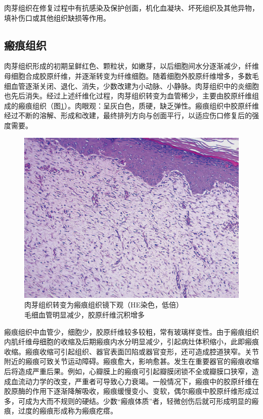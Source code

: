 肉芽组织在修复过程中有抗感染及保护创面，机化血凝块、坏死组织及其他异物，填补伤口或其他组织缺损等作用。

\subsection{瘢痕组织}

肉芽组织形成的初期呈鲜红色、颗粒状，如嫩芽，以后细胞间水分逐渐减少，纤维母细胞合成胶原纤维，并逐渐转变为纤维细胞。随着细胞外胶原纤维增多，多数毛细血管逐渐关闭、退化、消失，少数改建为小动脉、小静脉。肉芽组织中的炎细胞也先后消失。经过上述纤维化过程，肉芽组织转变为血管稀少，主要由胶原纤维组成的瘢痕组织（图\ref{fig2-5}）。肉眼观：呈灰白色，质硬，缺乏弹性。瘢痕组织中胶原纤维经过不断的溶解、形成和改建，最终排列方向与创面平行，以适应伤口修复后的强度需要。

\begin{figure}[!htbp]
	\centering
	\includegraphics{./images/Image00028.jpg}
	\caption{肉芽组织转变为瘢痕组织镜下观（HE染色，低倍） \\ {\small 毛细血管明显减少，胶原纤维沉积增多}}
	\label{fig2-5}
\end{figure}

瘢痕组织中血管少，细胞少，胶原纤维较多较粗，常有玻璃样变性。由于瘢痕组织内肌纤维母细胞的收缩及后期瘢痕内水分明显减少，引起病灶体积缩小，此即瘢痕收缩。瘢痕收缩可引起组织、器官表面凹陷或器官变形，还可造成腔道狭窄。关节附近的瘢痕可致关节运动障碍。瘢痕愈大，影响愈甚。发生在重要器官的瘢痕收缩后将造成严重后果。例如，心瓣膜上的瘢痕可引起瓣膜闭锁不全或瓣膜口狭窄，造成血流动力学的改变，严重者可导致心力衰竭。一般情况下，瘢痕中的胶原纤维在胶原酶的作用下逐渐降解吸收，瘢痕缓慢变小、变软，偶尔瘢痕中胶原纤维形成过多，可成为大而不规则的硬结。少数``瘢痕体质''者，轻微创伤后就可形成明显的瘢痕，过度的瘢痕形成称为瘢痕疙瘩。

